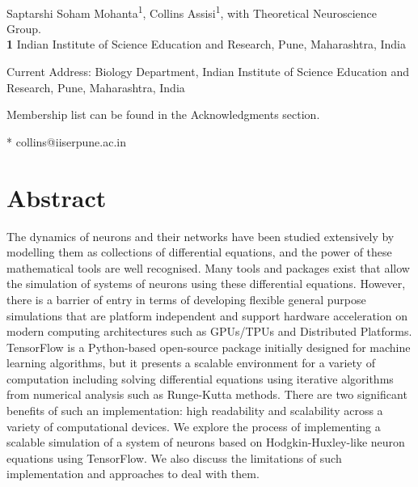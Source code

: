\documentclass[10pt,letterpaper]{article}
\begin{document}
\vspace*{0.2in}

\begin{flushleft}
{\Large
\textbf{} %
}
\newline
\\
Saptarshi Soham Mohanta\textsuperscript{1},
Collins Assisi\textsuperscript{1},
with Theoretical Neuroscience Group\textsuperscript{\textpilcrow}.
\\
\bigskip
\textbf{1} Indian Institute of Science Education and Research, Pune, Maharashtra, India
\\
\bigskip


\textcurrency Current Address: Biology Department, Indian Institute of Science Education and Research, Pune, Maharashtra, India 

\textpilcrow Membership list can be found in the Acknowledgments section.

* collins@iiserpune.ac.in

\end{flushleft}
\section*{Abstract}
The dynamics of neurons and their networks have been studied extensively by modelling them as collections of differential equations, and the power of these mathematical tools are well recognised. Many tools and packages exist that allow the simulation of systems of neurons using these differential equations. However, there is a barrier of entry in terms of developing flexible general purpose simulations that are platform independent and support hardware acceleration on modern computing architectures such as GPUs/TPUs and Distributed Platforms. TensorFlow is a Python-based open-source package initially designed for machine learning algorithms, but it presents a scalable environment for a variety of computation including solving differential equations using iterative algorithms from numerical analysis such as Runge-Kutta methods. There are two significant benefits of such an implementation: high readability and scalability across a variety of computational devices. We explore the process of implementing a scalable simulation of a system of neurons based on Hodgkin-Huxley-like neuron equations using TensorFlow. We also discuss the limitations of such implementation and approaches to deal with them. 
\end{document}
